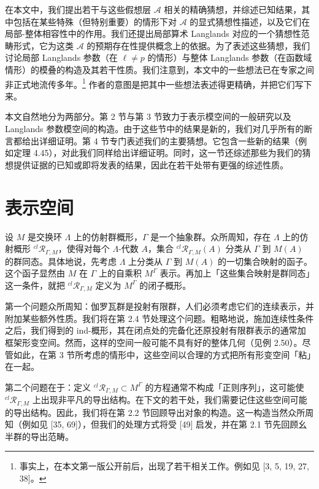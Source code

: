 在本文中，我们提出若干与这些假想层 $\mathcal A$ 相关的精确猜想，并综述已知结果，其中包括在某些特殊（但特别重要）的情形下对 $\mathcal A$ 的显式猜想性描述，以及它们在局部-整体相容性中的作用。我们还提出局部算术 Langlands 对应的一个猜想性范畴形式，它为这类 $\mathcal A$ 的预期存在性提供概念上的依据。为了表述这些猜想，我们讨论局部 Langlands 参数（在 $\ell\ne p$ 的情形）与整体 Langlands 参数（在函数域情形）的模叠的构造及其若干性质。我们注意到，本文中的一些想法已在专家之间非正式地流传多年。\footnote{事实上，在本文第一版公开前后，出现了若干相关工作。例如见 [3, 5, 19, 27, 38]。} 作者的意图是把其中一些想法表述得更精确，并把它们写下来。

本文自然地分为两部分。第 2 节与第 3 节致力于表示模空间的一般研究以及 Langlands 参数模空间的构造。由于这些节中的结果是新的，我们对几乎所有的断言都给出详细证明。第 4 节专门表述我们的主要猜想。它包含一些新的结果（例如定理 4.45），对此我们同样给出详细证明。同时，这一节还综述那些为我们的猜想提供证据的已知或即将发表的结果，因此在若干处带有更强的综述性质。

\section{表示空间}

设 $M$ 是交换环 $\Lambda$ 上的仿射群概形，$\Gamma$ 是一个抽象群。众所周知，存在 $\Lambda$ 上的仿射概形 ${}^{cl}\mathcal R_{\Gamma,M}$，使得对每个 $\Lambda$-代数 $A$，集合 ${}^{cl}\mathcal R_{\Gamma,M}(A)$ 分类从 $\Gamma$ 到 $M(A)$ 的群同态。具体地说，先考虑 $\Lambda$ 上分类从 $\Gamma$ 到 $M(A)$ 的一切集合映射的函子。这个函子显然由 $M$ 在 $\Gamma$ 上的自乘积 $M^\Gamma$ 表示。再加上「这些集合映射是群同态」这一条件，就把 ${}^{cl}\mathcal R_{\Gamma,M}$ 定义为 $M^\Gamma$ 的闭子概形。

第一个问题众所周知：伽罗瓦群是投射有限群，人们必须考虑它们的连续表示，并附加某些额外性质。我们将在第 2.4 节处理这个问题。粗略地说，施加连续性条件之后，我们得到的 ind-概形，其在闭点处的完备化还原投射有限群表示的通常加框架形变空间。然而，这样的空间一般可能不具有好的整体几何（见例 2.50）。尽管如此，在第 3 节所考虑的情形中，这些空间以合理的方式把所有形变空间「粘」在一起。

第二个问题在于：定义 ${}^{cl}\mathcal R_{\Gamma,M}\subset M^\Gamma$ 的方程通常不构成「正则序列」，这可能使 ${}^{cl}\mathcal R_{\Gamma,M}$ 上出现非平凡的导出结构。在下文的若干处，我们需要记住这些空间可能的导出结构。因此，我们将在第 2.2 节回顾导出对象的构造。这一构造当然众所周知（例如见 [35, 69]），但我们的处理方式将受 [49] 启发，并在第 2.1 节先回顾幺半群的导出范畴。

